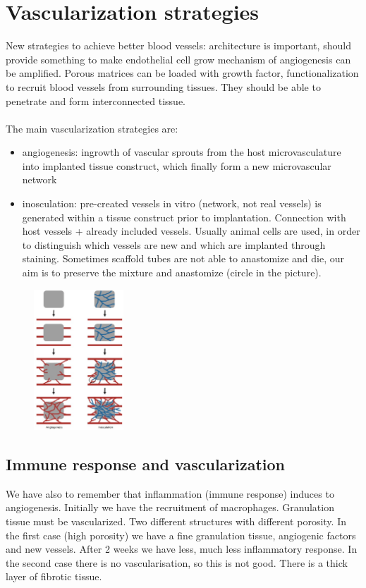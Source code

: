\section{Vascularization strategies}
New strategies to achieve better blood vessels: architecture is important, should provide something to make endothelial cell grow mechanism of angiogenesis can be amplified. Porous matrices can be loaded with growth factor, functionalization to recruit blood vessels from surrounding tissues. They should be able to penetrate and form interconnected tissue.
\\
\\
\noindent
The main vascularization strategies are:
\begin{itemize}
\item angiogenesis: ingrowth of vascular sprouts from the host microvasculature into implanted tissue construct, which finally form a new microvascular network
\item inosculation: pre-created vessels in vitro (network, not real vessels) is generated within a tissue construct prior to implantation. Connection with host vessels + already included vessels. Usually animal cells are used, in order to distinguish which vessels are new and which are implanted through staining. Sometimes scaffold tubes are not able to anastomize and die, our aim is to preserve the mixture and anastomize (circle in the picture).
\end{itemize}

\begin{figure}[h]
\centering
\includegraphics[width=0.3\textwidth]{vasc}
\caption{\label{fig:vasc}}
\end{figure}

\subsection{Immune response and vascularization}
We have also to remember that inflammation (immune response) induces to angiogenesis.
Initially we have the recruitment of macrophages. Granulation tissue must be vascularized.
Two different structures with different porosity. In the first case (high porosity) we have a fine granulation tissue, angiogenic factors and new vessels. After 2 weeks we have less, much less inflammatory response.  In the second case there is no vascularisation, so this is not good. There is a thick layer of fibrotic tissue.

